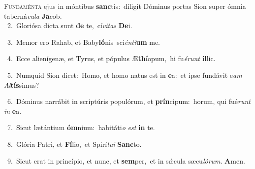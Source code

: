 \lettrine{\initial\textcolor{\initialcolor}{F}}{undaménta} ejus in móntibus \textbf{sanc}\-tis:~\star díligit Dóminus portas Sion super ómnia taberná\-\textit{cu}\-\textit{la} \textbf{Ja}\-cob.\\
{\numbfont\textcolor{\numbcolor}{~2.}}~Gloriósa dicta sunt \textbf{de} te,~\star cí\-\textit{vi}\-\textit{tas} \textbf{De}\-i.\par
{\numbfont\textcolor{\numbcolor}{~3.}}~Memor ero Rahab, et Baby\-\textbf{ló}\-nis~\star sci\-\textit{én}\-\textit{ti}\textbf{um} me.\par
{\numbfont\textcolor{\numbcolor}{~4.}}~Ecce alienígenæ, et Tyrus, et pópulus Æ\-\textbf{thí}\-opum,~\star hi fu\-\textit{é}\-\textit{runt} \textbf{il}\-lic.\par
{\numbfont\textcolor{\numbcolor}{~5.}}~Numquid Sion dicet:~\dagger Homo, et homo natus est in \textbf{e}\-a:~\star et ipse fundávit e\textit{am} \textit{Al}\-\textbf{tís}simus?\par
{\numbfont\textcolor{\numbcolor}{~6.}}~Dóminus narrábit in scriptúris populórum, et \textbf{prín}\-cipum:~\star horum, qui fué\textit{runt} \textit{in} \textbf{e}\-a.\par
{\numbfont\textcolor{\numbcolor}{~7.}}~Sicut lætántium \textbf{óm}\-nium:~\star habitáti\textit{o} \textit{est} \textbf{in} te.\par
{\numbfont\textcolor{\numbcolor}{~8.}}~Glória Patri, et \textbf{Fí}\-lio,~\star et Spirí\-\textit{tu}\-\textit{i} \textbf{Sanc}\-to.\par
{\numbfont\textcolor{\numbcolor}{~9.}}~Sicut erat in princípio, et nunc, et \textbf{sem}\-per,~\star et in sǽcula sæcu\-\textit{ló}\-\textit{rum}. \textbf{A}\-men.\par
